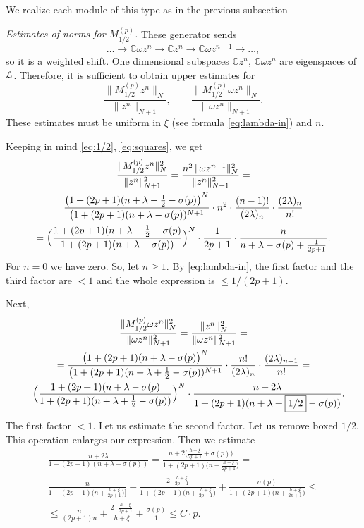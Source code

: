 \documentclass[]{amsart}
\newcounter{sec}
\def\le{\leqslant}
\def\ge{\geqslant}
\def\cL{\EuScript L}
\def\C {{\mathbb C }}
\def\sm{\smallskip}
\begin{document}
We realize each module of this type as in the previous subsection

\sm

{\it Estimates of norms for $M_{1/2}^{(p)}$.} These generator
 sends
$$
\dots \to \C \omega z^n \to \C z^n\to \C \omega z^{n-1}\to\dots,
$$
so it is a weighted shift. One dimensional subspaces $\C z^n$, $\C\omega z^n$ are eigenspaces of $\cL$. 
Therefore, it is sufficient to obtain  upper estimates  for
$$
\frac{\|M_{1/2}^{(p)} z^n\|_N} {\| z^n\|_{N+1}},
 \qquad
 \frac{\|M_{1/2}^{(p)}\omega z^n\|_N}{ \|\omega z^n\|_{N+1}}.
 $$
These estimates must be uniform in 
$\xi$ (see formula \eqref{eq:lambda-in}) and $n$. 
 
Keeping in  mind \eqref{eq:1/2}, \eqref{eq:squares}, we get
\begin{multline*}
\frac {\|M_{1/2}^{(p)} z^n\|_N^2} {\|z^n\|_{N+1}^2}= \frac {n^2\, \|\omega z^{n-1}\|_N^2} {\| z^n\|_{N+1}^2}
=\\=
\frac{\bigl(1+(2p+1)(n+\lambda-\frac12 -\sigma(p)\bigr)^N}{\bigl(1+(2p+1)(n+\lambda- \sigma(p))^{N+1}} 
\cdot n^2 \cdot \frac{(n-1)!}{(2\lambda)_n} \cdot \frac {(2\lambda)_n}{n!}
=\\=
\Bigl(\frac{1+(2p+1)(n+\lambda-\frac12 -\sigma(p)}{1+(2p+1)(n+\lambda- \sigma(p))}\Bigr)^N
\cdot \frac{1}{2p+1}\cdot\frac {n}{n+ \lambda-\sigma(p)+\frac{1}{2p+1}}.
\end{multline*}
For $n=0$ we have zero. So, let $n\ge 1$.
By \eqref{eq:lambda-in}, the first factor and the third factor are $<1$ and the whole expression
is $\le 1/(2p+1)$.

Next, 
\begin{multline*}
 \frac {\|M_{1/2}^{(p)}\omega z^n\|_N^2} {\|\omega z^n\|_{N+1}^2}= 
  \frac {\| z^n\|_N^2} {\|\omega z^n\|_{N+1}^2}=
 \\=\frac{\bigl(1+(2p+1)(n+\lambda -\sigma(p)\bigr)^N}
 {\bigl(1+(2p+1)(n+\lambda+\frac12- \sigma(p))^{N+1}} 
 \cdot \frac{n!}{(2\lambda)_n}\cdot\frac{(2\lambda)_{n+1}}{n!}
=\\= 
 \Bigl(\frac{1+(2p+1)(n+\lambda -\sigma(p)}
 {1+(2p+1)(n+\lambda+\frac12- \sigma(p))}\Bigr)^N
 \cdot
 \frac{n+2\lambda}
 {1+(2p+1)(n+\lambda+\boxed{1/2}- \sigma(p))}.
\end{multline*}
The first factor $< 1$. Let us estimate the second factor.
Let us remove boxed $1/2$. This operation enlarges our expression.
Then we estimate
\begin{multline}
 \frac{n+2\lambda}
 {1+(2p+1)(n+\lambda- \sigma(p))}
 = \frac{n+ 2\bigl(\frac{h+\xi}{2p+1}+\sigma(p)\bigr)}
 {1+(2p+1)\bigl(n+\frac{h+\xi}{2p+1} \bigr) }
 =\\ 
 \frac{n}{1+(2p+1)\bigl(n+\frac{h+\xi}{2p+1} \bigr)\bigr] }
 +
 \frac{2\cdot\frac{h+\xi}{2p+1}}{1+(2p+1)\bigl(n+\frac{h+\xi}{2p+1} \bigr) }
 +
  \frac{\sigma(p)}{1+(2p+1)\bigl(n+\frac{h+\xi}{2p+1} \bigr) } 
  \le\\\le 
  \frac{n}{(2p+1)n}+\frac{2\cdot\frac{h+\xi}{2p+1}}{h+\xi}+
  \frac{\sigma(p)}{1}\le C\cdot p.
  \label{eq:estimates}
\end{multline}
  
\end{document}
